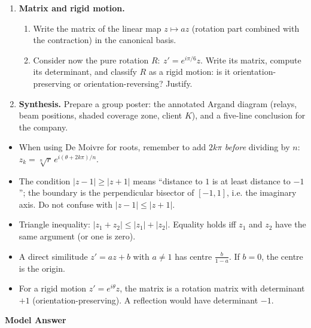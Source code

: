 \documentclass[11pt]{article}
\begin{document}
\begin{enumerate}
\item \textbf{Matrix and rigid motion.}
\begin{enumerate}
\item Write the matrix of the linear map $z \mapsto az$ (rotation part combined with the contraction) in the canonical basis.
\item Consider now the pure rotation $R:\ z' = e^{i\pi/6}z$. Write its matrix, compute its determinant, and classify $R$ as a rigid motion: is it orientation-preserving or orientation-reversing? Justify.
\end{enumerate}

\item \textbf{Synthesis.} Prepare a group poster: the annotated Argand diagram (relays, beam positions, shaded coverage zone, client $K$), and a five-line conclusion for the company.
\end{enumerate}

\begin{attention}
\begin{itemize}
\item When using De Moivre for roots, remember to add $2k\pi$ \emph{before} dividing by $n$: $z_k = \sqrt[n]{r}\, e^{i(\theta+2k\pi)/n}$.
\item The condition $|z-1|\ge|z+1|$ means ``distance to $1$ is at least distance to $-1$''; the boundary is the perpendicular bisector of $[-1,1]$, i.e. the imaginary axis. Do not confuse with $|z-1|\le|z+1|$.
\item Triangle inequality: $|z_1+z_2|\le|z_1|+|z_2|$. Equality holds iff $z_1$ and $z_2$ have the same argument (or one is zero).
\item A direct similitude $z'=az+b$ with $a\neq1$ has centre $\frac{b}{1-a}$. If $b=0$, the centre is the origin.
\item For a rigid motion $z'=e^{i\theta}z$, the matrix is a rotation matrix with determinant $+1$ (orientation-preserving). A reflection would have determinant $-1$.
\end{itemize}
\end{attention}

\textbf{Model Answer}\par
\end{document}

